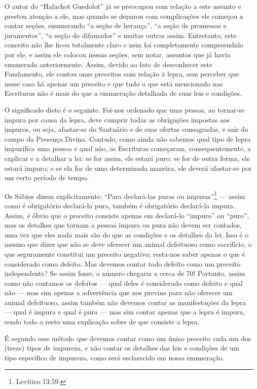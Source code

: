 O autor do ``Halachot Guedolot'' já se preocupou com relação a este
assunto e prestou atenção a ele, mas quando se deparou com complicações
ele começou a contar seções, enumerando ``a seção de herança'', ``a
seção de promessas e juramentos'', ``a seção do difamador'' e muitas
outras assim. Entretanto, este conceito não lhe ficou totalmente claro
e nem foi completamente compreendido por ele, e assim ele colocou
nessas seções, sem notar, assuntos que já havia enumerado
anteriormente. Assim, devido ao fato de desconhecer este Fundamento,
ele contou onze preceitos com relação à lepra, sem perceber que nesse
caso há apenas um preceito e que tudo o que está mencionado nas
Escrituras não é mais do que a enumeração detalhada de suas leis e
condições.

O significado disto é o seguinte. Foi-nos ordenado que uma pessoa, ao
tornar-se impura por causa da lepra, deve cumprir todas as obrigações
impostas aos impuros, ou seja, afastar-se do Santuário e de suas
ofertas consagradas, e sair do campo da Presença Divina. Contudo, como
ainda não sabemos qual tipo de lepra impurifica uma pessoa e qual não,
as Escrituras começaram, consequentemente, a explicar e a detalhar a
lei: se for assim, ele estará puro; se for de outra forma, ele estará
impuro; e se ela for de uma determinada maneira, ele deverá afastar-se
por um certo período de tempo.

Os Sábios dizem explicitamente: ``Para declará-las puras ou impuras''\footnote{Levítico 13:59.} --- assim como é obrigatório declará-la pura, também é
obrigatório declará-la impura. Assim, é óbvio que o preceito consiste
apenas em declará-lo ``impuro'' ou ``puro'', mas os detalhes que tornam
a pessoa impura ou pura não devem ser contados, uma vez que eles nada
mais são do que as condições e os detalhes da lei. Isso é o mesmo que
dizer que não se deve oferecer um animal defeituoso como sacrifício, o
que seguramente constitui um preceito negativo; resta-nos saber apenas
o que é considerado como defeito. Mas devemos contar todo defeito como
um preceito independente? Se assim fosse, o número chegaria a cerca de
70! Portanto, assim como não contamos os defeitos --- qual deles é
considerado como defeito e qual não --- mas sim apenas a advertência que
nos previne para não oferecer um animal defeituoso, assim também não
devemos contar as manifestações da lepra --- qual é impura e qual é pura
--- mas sim contar apenas que a lepra é impura, sendo todo o resto uma
explicação sobre de que consiste a lepra.

É segundo esse método que devemos contar como um único preceito cada um
dos (treze) tipos de impureza, e não contar os detalhes das leis e
condições de um tipo específico de impureza, como será esclarecido em
nossa enumeração.


